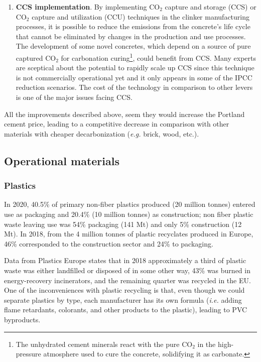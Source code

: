 \begin{enumerate}
\item \textbf{CCS implementation}. By implementing CO$_2$ capture and storage (CCS) or CO$_2$ capture and utilization (CCU) techniques in the clinker manufacturing processes, it is possible to reduce the emissions from the concrete's life cycle that cannot be eliminated by changes in the production and use processes. The development of some novel concretes, which depend on a source of pure captured CO$_2$ for carbonation curing\footnote{The unhydrated cement minerals react with the pure CO$_2$ in the high-pressure atmosphere used to cure the concrete, solidifying it as carbonate.}, could benefit from CCS. Many experts are sceptical about the potential to rapidly scale up CCS since this technique is not commercially operational yet and it only appears in some of the IPCC reduction scenarios. The cost of the technology in comparison to other levers is one of the major issues facing CCS.
\end{enumerate}

All the improvements described above, seem they would increase the Portland cement price, leading to a competitive decrease in comparison with other materials with cheaper decarbonization (\textit{e.g.} brick, wood, etc.).

\subsection{Operational materials}
\label{sec:materials_used_for_services}

\subsubsection{Plastics}
\label{sec:plastics}

In 2020, 40.5\% of primary non-fiber plastics produced (20 million tonnes) entered use as packaging and 20.4\% (10 million tonnes) as construction;\autocite{plasticseurpo_2021} non fiber plastic waste leaving use was 54\% packaging (141 Mt) and only 5\% construction (12 Mt).\autocite{geyer2017production} In 2018, from the 4 million tonnes of plastic recyclates produced in Europe, 46\% corresponded to the construction sector and 24\% to packaging.\autocite{plasticseurpo_2021}

Data from Plastics Europe states that in 2018 approximately a third of plastic waste was either landfilled or disposed of in some other way, 43\% was burned in energy-recovery incinerators, and the remaining quarter was recycled in the EU.\autocite{asbp_2020} One of the inconveniences with plastic recycling is that, even though we could separate plastics by type, each manufacturer has its own formula (\textit{i.e.} adding flame retardants, colorants, and other products to the plastic), leading to PVC byproducts.\autocite{kommerling_2022}

